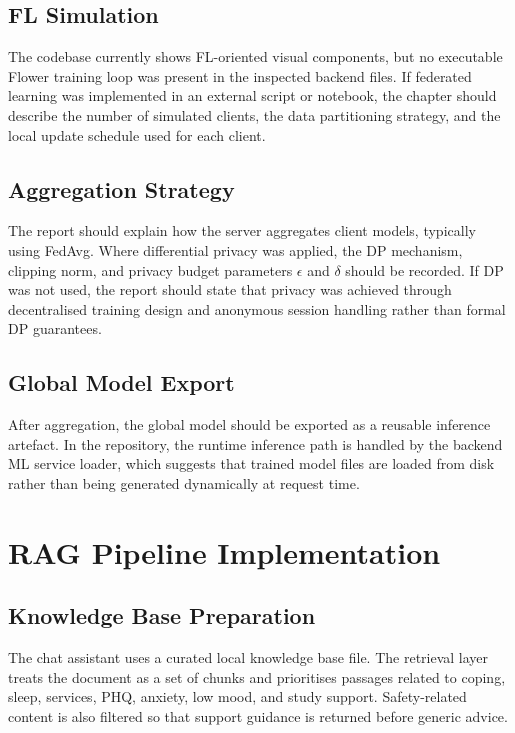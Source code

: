 \subsection{FL Simulation}

The codebase currently shows FL-oriented visual components, but no executable Flower training loop was present in the inspected backend files. If federated learning was implemented in an external script or notebook, the chapter should describe the number of simulated clients, the data partitioning strategy, and the local update schedule used for each client.

\subsection{Aggregation Strategy}

The report should explain how the server aggregates client models, typically using FedAvg. Where differential privacy was applied, the DP mechanism, clipping norm, and privacy budget parameters \(\epsilon\) and \(\delta\) should be recorded. If DP was not used, the report should state that privacy was achieved through decentralised training design and anonymous session handling rather than formal DP guarantees.

\subsection{Global Model Export}

After aggregation, the global model should be exported as a reusable inference artefact. In the repository, the runtime inference path is handled by the backend ML service loader, which suggests that trained model files are loaded from disk rather than being generated dynamically at request time.

\section{RAG Pipeline Implementation}

\subsection{Knowledge Base Preparation}

The chat assistant uses a curated local knowledge base file. The retrieval layer treats the document as a set of chunks and prioritises passages related to coping, sleep, services, PHQ, anxiety, low mood, and study support. Safety-related content is also filtered so that support guidance is returned before generic advice.

